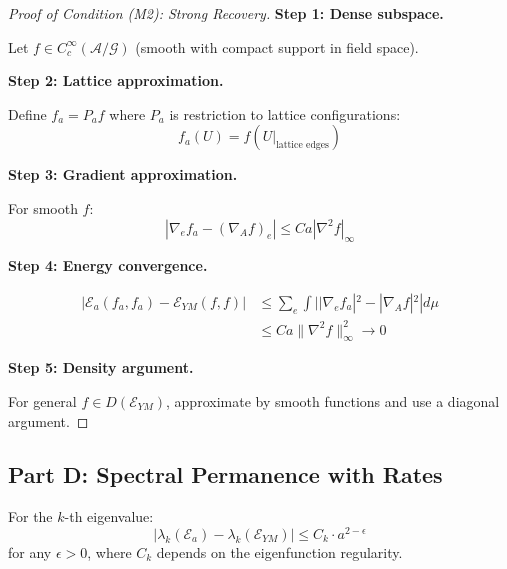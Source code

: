 \begin{proof}[Proof of Condition (M2): Strong Recovery]

\textbf{Step 1: Dense subspace.}

Let $f \in C^\infty_c(\mathcal{A}/\mathcal{G})$ (smooth with compact support in 
field space).

\textbf{Step 2: Lattice approximation.}

Define $f_a = P_a f$ where $P_a$ is restriction to lattice configurations:
\begin{equation}
f_a(U) = f(U|_{\text{lattice edges}})
\end{equation}

\textbf{Step 3: Gradient approximation.}

For smooth $f$:
\begin{equation}
|\nabla_e f_a - (\nabla_A f)_e| \leq C a |\nabla^2 f|_\infty
\end{equation}

\textbf{Step 4: Energy convergence.}

\begin{align}
|\mathcal{E}_a(f_a, f_a) - \mathcal{E}_{YM}(f, f)| &\leq \sum_e \int ||\nabla_e f_a|^2 - |\nabla_A f|^2| d\mu \\
&\leq C a \|\nabla^2 f\|_\infty^2 \to 0
\end{align}

\textbf{Step 5: Density argument.}

For general $f \in D(\mathcal{E}_{YM})$, approximate by smooth functions and 
use a diagonal argument.
\end{proof}

\subsection{Part D: Spectral Permanence with Rates}

\begin{theorem}
\label{thm:spectral-rate}
For the $k$-th eigenvalue:
\begin{equation}
|\lambda_k(\mathcal{E}_a) - \lambda_k(\mathcal{E}_{YM})| \leq C_k \cdot a^{2-\epsilon}
\end{equation}
for any $\epsilon > 0$, where $C_k$ depends on the eigenfunction regularity.
\end{theorem}

